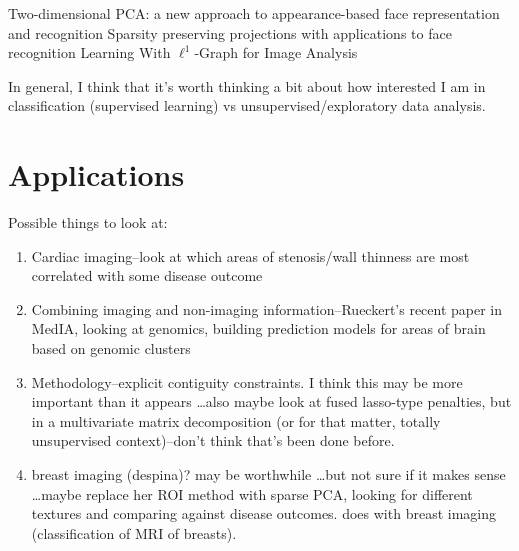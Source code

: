 \documentclass{nih}
\begin{document}
Two-dimensional PCA: a new approach to appearance-based face representation and recognition
Sparsity preserving projections with applications to face recognition
Learning With $\ell^1$-Graph for Image Analysis



In general, I think that it's worth thinking a bit about how interested I am in classification (supervised learning) vs unsupervised/exploratory data analysis.  

\section{Applications}
Possible things to look at: 
\begin{enumerate}
\item Cardiac imaging--look at which areas of stenosis/wall thinness are most correlated with some disease outcome
\item Combining imaging and non-imaging information--Rueckert's recent paper in MedIA, looking at genomics, building prediction models for areas of brain based on genomic clusters
\item Methodology--explicit contiguity constraints.  I think this may be more important than it appears \ldots also maybe look at fused lasso-type penalties, but in a multivariate matrix decomposition (or for that matter, totally unsupervised context)--don't think that's been done before. 
\item breast imaging (despina)? may be worthwhile \ldots but not sure if it makes sense \ldots maybe replace her ROI method with sparse PCA, looking for different textures and comparing against disease outcomes. \cite{levman_computer-aided_2010} does with breast imaging (classification of MRI of breasts). 
\end{enumerate}



\end{document}
